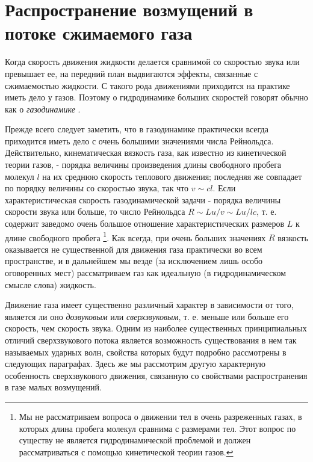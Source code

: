 \section{Распространение возмущений в потоке сжимаемого газа}\label{sec:p82}


Когда скорость движения жидкости делается сравнимой со скоростью звука или превышает ее, на передний план выдвигаются эффекты, связанные с сжимаемостью жидкости.
С такого рода движениями приходится на практике иметь дело у газов. Поэтому о гидродинамике больших скоростей говорят обычно как о \emph{газодинамике} .

Прежде всего следует заметить, что в газодинамике практически всегда приходится иметь дело с очень большими значениями числа Рейнольдса. 
Действительно, кинематическая вязкость газа, как известно из кинетической теории газов, - порядка величины произведения длины свободного пробега молекул $l$ на их среднюю скорость теплового движения; последняя же совпадает по порядку величины со скоростью звука, так что $v \sim cl$.
Если характеристическая скорость газодинамической задачи - порядка величины скорости звука или больше, то число Рейнольдса $R \sim Lu/v \sim Lu/lc$, т. е. содержит заведомо очень большое отношение характеристических размеров $L$ к длине свободного пробега 
\footnote{Мы не рассматриваем вопроса о движении тел в очень разреженных газах, в которых длина пробега молекул сравнима с размерами тел. Этот вопрос по существу не является гидродинамической проблемой и должен рассматриваться с помощью кинетической теории газов.}.
Как всегда, при очень больших значениях $R$ вязкость оказывается не существенной для движения газа практически во всем пространстве, и в дальнейшем мы везде (за исключением лишь особо оговоренных мест) рассматриваем газ как идеальную (в гидродинамическом смысле слова) жидкость.

Движение газа имеет существенно различный характер в зависимости от того, является ли оно \emph{дозвуковым} или \emph{сверхзвуковым}, т. е. меньше или больше его скорость, чем скорость звука.
Одним из наиболее существенных принципиальных отличий сверхзвукового потока является возможность существования в нем так называемых ударных волн, свойства которых будут подробно рассмотрены в следующих параграфах.
Здесь же мы рассмотрим другую характерную особенность сверхзвукового движения, связанную со свойствами распространения в газе малых возмущений.



